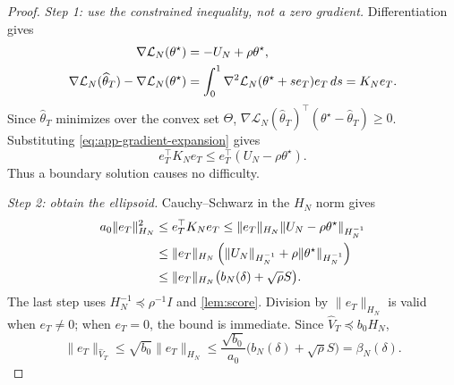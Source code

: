 \documentclass[10pt,twoside,letterpaper]{article}
\newcommand{\norm}[1]{\lVert #1\rVert}
\newcommand{\thetahat}{\widehat\theta}
\newcommand{\Vhat}{\widehat V}
\begin{document}
\begin{proof}
\textit{Step 1: use the constrained inequality, not a zero gradient.}
Differentiation gives
\begin{align}
\nabla\mathcal L_N(\theta^\star)&=-U_N+\rho\theta^\star,\notag\\
\nabla\mathcal L_N(\thetahat_T)-\nabla\mathcal L_N(\theta^\star)
&=\int_0^1\nabla^2\mathcal L_N(\theta^\star+s e_T)e_T\,ds
=K_Ne_T.
\label{eq:app-gradient-expansion}
\end{align}
Since $\thetahat_T$ minimizes over the convex set $\Theta$,
$\nabla\mathcal L_N(\thetahat_T)^\top(\theta^\star-\thetahat_T)\ge0$.
Substituting \eqref{eq:app-gradient-expansion} gives
\begin{equation}
e_T^\top K_Ne_T
\le e_T^\top(U_N-\rho\theta^\star).
\label{eq:app-variational}
\end{equation}
Thus a boundary solution causes no difficulty.

\textit{Step 2: obtain the ellipsoid.}
Cauchy--Schwarz in the $H_N$ norm gives
\begin{align}
a_0\norm{e_T}_{H_N}^2
&\le e_T^\top K_Ne_T
\le\norm{e_T}_{H_N}\norm{U_N-\rho\theta^\star}_{H_N^{-1}}\notag\\
&\le\norm{e_T}_{H_N}
\left(\norm{U_N}_{H_N^{-1}}+
\rho\norm{\theta^\star}_{H_N^{-1}}\right)\notag\\
&\le\norm{e_T}_{H_N}\big(b_N(\delta)+\sqrt\rho S\big).
\label{eq:app-constrained-cauchy}
\end{align}
The last step uses $H_N^{-1}\preceq\rho^{-1}I$ and
\cref{lem:score}. Division by $\norm{e_T}_{H_N}$ is valid when $e_T\ne0$;
when $e_T=0$, the bound is immediate. Since
$\Vhat_T\preceq b_0H_N$,
\begin{equation}
\norm{e_T}_{\Vhat_T}
\le\sqrt{b_0}\norm{e_T}_{H_N}
\le\frac{\sqrt{b_0}}{a_0}\big(b_N(\delta)+\sqrt\rho S\big)
=\beta_N(\delta).
\label{eq:app-ellipsoid-result}
\end{equation}


\end{proof}
\end{document}
